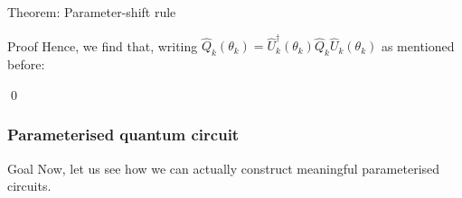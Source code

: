 \documentclass[a4paper]{article}
\begin{document}
\begin{parag}{Theorem: Parameter-shift rule}
\begin{subparag}{Proof}
        Hence, we find that, writing $\hat{Q}_k\left(\theta_k\right) = \hat{U}_k^{\dagger}\left(\theta_k\right) \hat{Q}_k \hat{U}_k\left(\theta_k\right)$ as mentioned before:

        \qed
    \end{subparag}
\end{parag}

\subsubsection{Parameterised quantum circuit}

\begin{parag}{Goal}
    Now, let us see how we can actually construct meaningful parameterised circuits.
\end{parag}
\end{document}
